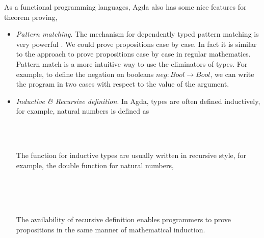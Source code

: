 As a functional programming languages, Agda also has some nice features for theorem proving,

\begin{itemize}

\item \textit{Pattern matching}. The mechanism for dependently typed pattern matching is very powerful \cite{alti:pisigma-new}. We could prove propositions case by case. In fact it is similar to the approach to prove propositions case by case in regular mathematics. Pattern match is a more intuitive way to use the eliminators of types. For example, to define the negation on booleans $neg : Bool \to Bool$, we can write the program in two cases with respect to the value of the argument.

\item \textit{Inductive \& Recursive definition}. In Agda, types are often defined inductively, for example, natural numbers is defined as

\begin{code}\>\<%
\>  \AgdaSymbol{:}  \<%
\\
\>[0]\<[2]%
\>[2] \AgdaSymbol{:} \<%
\\
\>[0]\<[2]%
\>[2] \<[7]%
\>[7]\AgdaSymbol{:} \AgdaSymbol{(} \AgdaSymbol{:} \AgdaSymbol{)}  \<%
\>\<\end{code}

The function for inductive types are usually written in recursive style, for example, the double function for natural numbers,

\begin{code}\>\<%
\\
\> \AgdaSymbol{:}   \<%
\\
\>  \AgdaSymbol{=} \<%
\\
\> \AgdaSymbol{(} \AgdaSymbol{)} \AgdaSymbol{=}  \AgdaSymbol{(} \AgdaSymbol{(} \AgdaSymbol{))}\<%
\>\<\end{code}

The availability of recursive definition enables programmers to prove propositions in the same manner of mathematical induction. 


\end{itemize}
